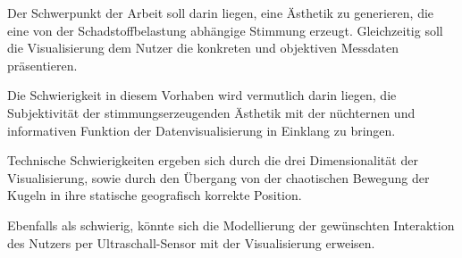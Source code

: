 \documentclass[12pt]{article} %
\begin{document}
Der Schwerpunkt der Arbeit soll darin liegen, eine Ästhetik zu generieren, die eine von der Schadstoffbelastung abhängige Stimmung erzeugt.
Gleichzeitig soll die Visualisierung dem Nutzer die konkreten und objektiven Messdaten präsentieren.  

Die Schwierigkeit in diesem Vorhaben wird vermutlich darin liegen, die Subjektivität der stimmungserzeugenden Ästhetik mit der nüchternen und informativen Funktion der Datenvisualisierung in Einklang zu bringen.

Technische Schwierigkeiten ergeben sich durch die drei Dimensionalität der Visualisierung, sowie durch den Übergang von der chaotischen Bewegung der Kugeln in ihre statische geografisch korrekte Position.

Ebenfalls als schwierig, könnte sich die Modellierung der gewünschten Interaktion des Nutzers per Ultraschall-Sensor mit der Visualisierung erweisen.


\listoffigures %

\end{document}
